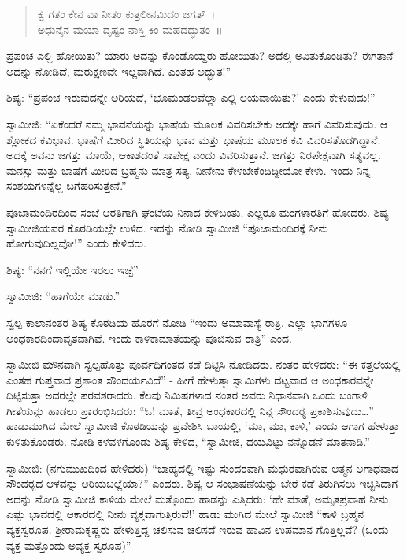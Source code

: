 \begin{verse}
ಕ್ವ ಗತಂ ಕೇನ ವಾ ನೀತಂ ಕುತ್ರಲೀನಮಿದಂ ಜಗತ್~।\\ಅಧುನೈನ ಮಯಾ ದೃಷ್ಟಂ ನಾಸ್ತಿ ಕಿಂ ಮಹದದ್ಭುತಂ~॥ 
\end{verse}

 ಪ್ರಪಂಚ ಎಲ್ಲಿ ಹೋಯಿತು? ಯಾರು ಅದನ್ನು ಕೊಂಡೊಯ್ದರು ಹೋಯಿತು? ಅದೆಲ್ಲಿ ಅವಿತುಕೊಂಡಿತು? ಈಗತಾನೆ ಅದನ್ನು ನೋಡಿದೆ, ಮರುಕ್ಷಣವೇ ಇಲ್ಲವಾಗಿದೆ. ಎಂತಹ ಅದ್ಭುತ!” 

 ಶಿಷ್ಯ: “ಪ್ರಪಂಚ ಇರುವುದನ್ನೇ ಅರಿಯದೆ, ‘ಭೂಮಂಡಲವೆಲ್ಲಾ ಎಲ್ಲಿ ಲಯವಾಯಿತು?’ ಎಂದು ಕೇಳುವುದು!” 

 ಸ್ವಾಮೀಜಿ: “ಏಕೆಂದರೆ ನಮ್ಮ ಭಾವನೆಯನ್ನು ಭಾಷೆಯ ಮೂಲಕ ವಿವರಿಸಬೇಕು ಅದಕ್ಕೇ ಹಾಗೆ ವಿವರಿಸುವುದು. ಆ ಶ್ಲೋಕದ ಕವಿಭಾವ. ಭಾಷೆಗೆ ಮೀರಿದ ಸ್ಥಿತಿಯನ್ನು ಭಾವ ಮತ್ತು ಭಾಷೆಯ ಮೂಲಕ ಕವಿ ವಿವರಿಸತೊಡಗಿದ್ದಾನೆ. ಅದಕ್ಕೆ ಅವನು ಜಗತ್ತು ಮಾಯೆ, ಆಕಾಶದಂತೆ ಸಾಪೇಕ್ಷ ಎಂದು ವಿವರಿಸುತ್ತಾನೆ. ಜಗತ್ತು ನಿರಪೇಕ್ಷವಾಗಿ ಸತ್ಯವಲ್ಲ. ಮನಸ್ಸು ಮತ್ತು ಭಾಷೆಗೆ ಮೀರಿದ ಬ್ರಹ್ಮನು ಮಾತ್ರ ಸತ್ಯ. ನೀನೇನು ಕೇಳಬೇಕೆಂದಿದ್ದೀಯೋ ಕೇಳು. ಇಂದು ನಿನ್ನ ಸಂಶಯಗಳನ್ನೆಲ್ಲ ಬಗೆಹರಿಸುತ್ತೇನೆ.” 

 ಪೂಜಾಮಂದಿರದಿಂದ ಸಂಜೆ ಆರತಿಗಾಗಿ ಘಂಟೆಯ ನಿನಾದ ಕೇಳಿಬಂತು. ಎಲ್ಲರೂ ಮಂಗಳಾರತಿಗೆ ಹೋದರು. ಶಿಷ್ಯ ಸ್ವಾಮೀಜಿಯವರ ಕೊಠಡಿಯಲ್ಲೇ ಉಳಿದ. ಇದನ್ನು ನೋಡಿ ಸ್ವಾಮೀಜಿ “ಪೂಜಾಮಂದಿರಕ್ಕೆ ನೀನು ಹೋಗುವುದಿಲ್ಲವೋ!” ಎಂದು ಕೇಳಿದರು. 

 ಶಿಷ್ಯ: “ನನಗೆ ಇಲ್ಲಿಯೇ ಇರಲು ಇಚ್ಛೆ” 

 ಸ್ವಾಮೀಜಿ: “ಹಾಗೆಯೇ ಮಾಡು.” 

 ಸ್ವಲ್ಪ ಕಾಲಾನಂತರ ಶಿಷ್ಯ ಕೊಠಡಿಯ ಹೊರಗೆ ನೋಡಿ “ಇಂದು ಅಮಾವಾಸ್ಯೆ ರಾತ್ರಿ. ಎಲ್ಲಾ ಭಾಗಗಳೂ ಅಂಧಕಾರದಿಂದಾವೃತವಾಗಿವೆ. ಇಂದು ಕಾಳಿಕಾಮಾತೆಯನ್ನು ಪೂಜಿಸುವ ರಾತ್ರಿ” ಎಂದ. 

 ಸ್ವಾಮೀಜಿ ಮೌನವಾಗಿ ಸ್ವಲ್ಪಹೊತ್ತು ಪೂರ್ವದಿಗಂತದ ಕಡೆ ದಿಟ್ಟಿಸಿ ನೋಡಿದರು. ನಂತರ ಹೇಳಿದರು: “ಈ ಕತ್ತಲೆಯಲ್ಲಿ ಎಂತಹ ಗುಪ್ತವಾದ ಪ್ರಶಾಂತ ಸೌಂದರ್ಯವಿದೆ” - ಹೀಗೆ ಹೇಳುತ್ತಾ ಸ್ವಾಮಿಗಳು ದಟ್ಟವಾದ ಆ ಅಂಧಕಾರವನ್ನೇ ದಿಟ್ಟಿಸುತ್ತಾ ಅದರಲ್ಲೇ ಪರವಶರಾದರು. ಕೆಲವು ನಿಮಿಷಗಳಾದ ನಂತರ ಅವರು ನಿಧಾನವಾಗಿ ಒಂದು ಬಂಗಾಳಿ ಗೀತೆಯನ್ನು ಹಾಡಲು ಪ್ರಾರಂಭಿಸಿದರು: “ಓ! ಮಾತೆ, ತೀವ್ರ ಅಂಧಕಾರದಲ್ಲಿ ನಿನ್ನ ಸೌಂದರ‍್ಯ ಪ್ರಕಾಶಿಸುವುದು…” ಹಾಡುಮುಗಿದ ಮೇಲೆ ಸ್ವಾಮೀಜಿ ಕೊಠಡಿಯನ್ನು ಪ್ರವೇಶಿಸಿ ಬಾಯಲ್ಲಿ, ‘ಮಾ, ಮಾ, ಕಾಳಿ,’ ಎಂದು ಆಗಾಗ ಹೇಳುತ್ತಾ ಕುಳಿತುಕೊಂಡರು. ನೋಡಿ ಕಳವಳಗೊಂಡು ಶಿಷ್ಯ ಕೇಳಿದ, “ಸ್ವಾಮೀಜಿ, ದಯವಿಟ್ಟು ನನ್ನೊಡನೆ ಮಾತನಾಡಿ.” 

 ಸ್ವಾಮೀಜಿ: (ನಗುಮುಖದಿಂದ ಹೇಳಿದರು) “ಬಾಹ್ಯದಲ್ಲಿ ಇಷ್ಟು ಸುಂದರವಾಗಿ ಮಧುರವಾಗಿರುವ ಆತ್ಮನ ಅಗಾಧವಾದ ಸೌಂದರ‍್ಯದ ಆಳವನ್ನು ಅರಿಯಬಲ್ಲೆಯಾ?” ಎಂದರು. ಶಿಷ್ಯ ಆ ಸಂಭಾಷಣೆಯನ್ನು ಬೇರೆ ಕಡೆ ತಿರುಗಿಸಲು ಇಚ್ಛಿಸಿದಾಗ ಅದನ್ನು ನೋಡಿ ಸ್ವಾಮೀಜಿ ಕಾಳಿಯ ಮೇಲೆ ಮತ್ತೊಂದು ಹಾಡನ್ನು ಎತ್ತಿದರು: ‘ಹೇ ಮಾತೆ, ಅಮೃತಪ್ರವಾಹ ನೀನು, ಎಷ್ಟು ಭಾವದಲ್ಲಿ ಆಕಾರದಲ್ಲಿ ನೀನು ವ್ಯಕ್ತವಾಗುತ್ತಿರುವೆ!’ ಹಾಡು ಮುಗಿದ ಮೇಲೆ ಸ್ವಾಮೀಜಿ “ಕಾಳಿ ಬ್ರಹ್ಮನ ವ್ಯಕ್ತಸ್ವರೂಪ. ಶ‍್ರೀರಾಮಕೃಷ್ಣರು ಹೇಳುತ್ತಿದ್ದ ಚಲಿಸುವ ಚಲಿಸದೆ ಇರುವ ಹಾವಿನ ಉಪಮಾನ ಗೊತ್ತಿಲ್ಲವೆ? (ಒಂದು ವ್ಯಕ್ತ ಮತ್ತೊಂದು ಅವ್ಯಕ್ತ ಸ್ವರೂಪ)” 

